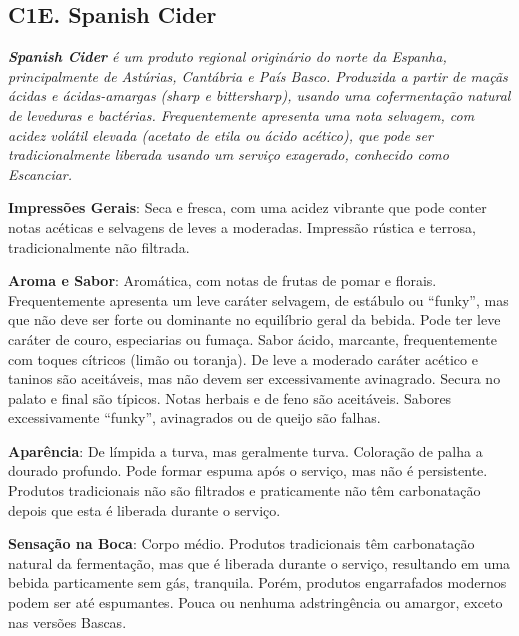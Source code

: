 \subsection*{C1E. Spanish Cider}

\textit{\textbf{Spanish Cider} é um produto regional originário do norte da Espanha, principalmente de Astúrias, Cantábria e País Basco. Produzida a partir de maçãs ácidas e ácidas-amargas (\textit{sharp} e \textit{bittersharp}), usando uma cofermentação natural de leveduras e bactérias. Frequentemente apresenta uma nota selvagem, com acidez volátil elevada (acetato de etila ou ácido acético), que pode ser tradicionalmente liberada usando um serviço exagerado, conhecido como \textit{Escanciar}.}

\textbf{Impressões Gerais}: Seca e fresca, com uma acidez vibrante que pode conter notas acéticas e selvagens de leves a moderadas. Impressão rústica e terrosa, tradicionalmente não filtrada.

\textbf{Aroma e Sabor}: Aromática, com notas de frutas de pomar e florais. Frequentemente apresenta um leve caráter selvagem, de estábulo ou “funky”, mas que não deve ser forte ou dominante no equilíbrio geral da bebida. Pode ter leve caráter de couro, especiarias ou fumaça. Sabor ácido, marcante, frequentemente com toques cítricos (limão ou toranja). De leve a moderado caráter acético e taninos são aceitáveis, mas não devem ser excessivamente avinagrado. Secura no palato e final são típicos. Notas herbais e de feno são aceitáveis. Sabores excessivamente “funky”, avinagrados ou de queijo são falhas.

\textbf{Aparência}: De límpida a turva, mas geralmente turva. Coloração de palha a dourado profundo. Pode formar espuma após o serviço, mas não é persistente. Produtos tradicionais não são filtrados e praticamente não têm carbonatação depois que esta é liberada durante o serviço.

\textbf{Sensação na Boca}: Corpo médio. Produtos tradicionais têm carbonatação natural da fermentação, mas que é liberada durante o serviço, resultando em uma bebida particamente sem gás, tranquila. Porém, produtos engarrafados modernos podem ser até espumantes. Pouca ou nenhuma adstringência ou amargor, exceto nas versões Bascas.

